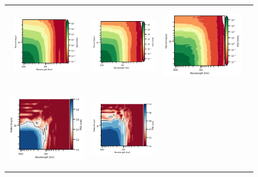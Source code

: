 \begin{figure}[t!]
\begin{center}
\begin{tabular}{cccc}
\includegraphics[trim={14mm 0 23mm 0},clip, width=3cm,height=3.5cm]{00_Oceanbench/content/figures/fourdvarnet_figs/osse_gf_nadirswot_psd_spacetime.png} &
\hspace{-5mm}\includegraphics[trim={14mm 0 23mm 0},clip, width=3cm,height=3.5cm]{00_Oceanbench/content/figures/fourdvarnet_figs/osse_gf_nadir_sst_psd_spacetime.png} &
\hspace{-5mm}\includegraphics[trim={14mm 0 0 0},clip,width=3.8cm,height=3.5cm]{00_Oceanbench/content/figures/fourdvarnet_figs/ose_gf_psd_spacetime.png} \\
\hspace{-4mm}\includegraphics[trim={0 0 23mm 0},clip, width=3.70cm,height=3.5cm]{00_Oceanbench/content/figures/fourdvarnet_figs/osse_gf_nadir_psd_spacetime_score.png} &
\hspace{-2mm}\includegraphics[trim={13mm 0 23mm 0},clip, width=3.1cm,height=3.5cm]{00_Oceanbench/content/figures/fourdvarnet_figs/osse_gf_nadirswot_psd_spacetime_score.png} &

\end{tabular}
\end{center}
\end{figure}
